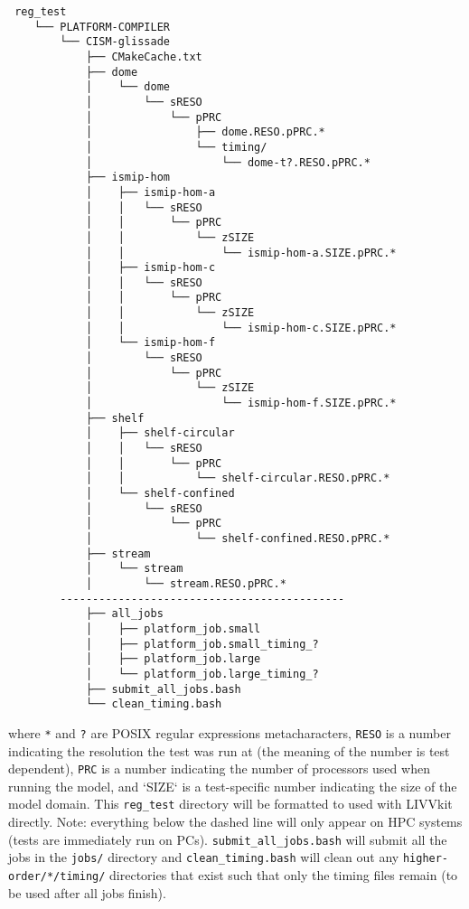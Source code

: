\begin{verbatim}
 reg_test
    └── PLATFORM-COMPILER
        └── CISM-glissade
            ├── CMakeCache.txt
            ├── dome
            │    └── dome
            │        └── sRESO
            │            └── pPRC
            │                ├── dome.RESO.pPRC.*
            │                └── timing/
            │                    └── dome-t?.RESO.pPRC.*
            ├── ismip-hom
            │    ├── ismip-hom-a
            │    │   └── sRESO
            │    │       └── pPRC
            │    │           └── zSIZE
            │    │               └── ismip-hom-a.SIZE.pPRC.*
            │    ├── ismip-hom-c
            │    │   └── sRESO
            │    │       └── pPRC
            │    │           └── zSIZE
            │    │               └── ismip-hom-c.SIZE.pPRC.*
            │    └── ismip-hom-f
            │        └── sRESO
            │            └── pPRC
            │                └── zSIZE
            │                    └── ismip-hom-f.SIZE.pPRC.*
            ├── shelf
            │    ├── shelf-circular
            │    │   └── sRESO
            │    │       └── pPRC
            │    │           └── shelf-circular.RESO.pPRC.*
            │    └── shelf-confined
            │        └── sRESO
            │            └── pPRC
            │                └── shelf-confined.RESO.pPRC.*
            ├── stream 
            │    └── stream
            │        └── stream.RESO.pPRC.*
        --------------------------------------------
            ├── all_jobs
            │    ├── platform_job.small
            │    ├── platform_job.small_timing_?
            │    ├── platform_job.large
            │    └── platform_job.large_timing_?
            ├── submit_all_jobs.bash
            └── clean_timing.bash
\end{verbatim}

\noindent
where \texttt{*} and \texttt{?} are POSIX regular expressions metacharacters, \texttt{RESO} is a number indicating the
resolution the test was run at (the meaning of the number is test dependent), \texttt{PRC} is a number indicating the
number of processors used when running the model, and `SIZE` is a test-specific number indicating the size of the model
domain. This \texttt{reg\_test} directory will be formatted to used with LIVVkit directly.  Note: everything below the
dashed line will only appear on HPC systems (tests are immediately run on PCs).  \texttt{submit\_all\_jobs.bash} will
submit all the jobs in the \texttt{jobs/} directory and \texttt{clean\_timing.bash} will clean out any
\texttt{higher-order/*/timing/} directories that exist such that only the timing files remain (to be used after all jobs
finish).

